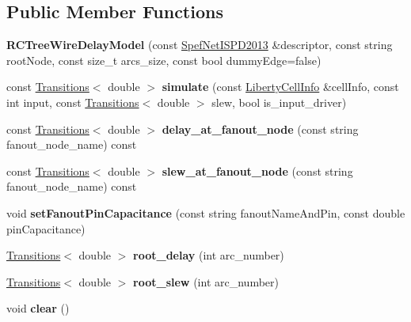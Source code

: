 \subsection*{Public Member Functions}
\begin{DoxyCompactItemize}
\item 
\hypertarget{classRCTreeWireDelayModel_a239d4784b2d39b6042fe39bee4838c6b}{{\bfseries R\-C\-Tree\-Wire\-Delay\-Model} (const \hyperlink{classSpefNetISPD2013}{Spef\-Net\-I\-S\-P\-D2013} \&descriptor, const string root\-Node, const size\-\_\-t arcs\-\_\-size, const bool dummy\-Edge=false)}\label{classRCTreeWireDelayModel_a239d4784b2d39b6042fe39bee4838c6b}

\item 
\hypertarget{classRCTreeWireDelayModel_a06312bef3b98f0903335227fd7ea0f31}{const \hyperlink{classTransitions}{Transitions}$<$ double $>$ {\bfseries simulate} (const \hyperlink{structLibertyCellInfo}{Liberty\-Cell\-Info} \&cell\-Info, const int input, const \hyperlink{classTransitions}{Transitions}$<$ double $>$ slew, bool is\-\_\-input\-\_\-driver)}\label{classRCTreeWireDelayModel_a06312bef3b98f0903335227fd7ea0f31}

\item 
\hypertarget{classRCTreeWireDelayModel_a7c769d54e8a520db1c5d4537d7e8b608}{const \hyperlink{classTransitions}{Transitions}$<$ double $>$ {\bfseries delay\-\_\-at\-\_\-fanout\-\_\-node} (const string fanout\-\_\-node\-\_\-name) const }\label{classRCTreeWireDelayModel_a7c769d54e8a520db1c5d4537d7e8b608}

\item 
\hypertarget{classRCTreeWireDelayModel_aea4c7315bdd3715ca0c67707b2c32a8c}{const \hyperlink{classTransitions}{Transitions}$<$ double $>$ {\bfseries slew\-\_\-at\-\_\-fanout\-\_\-node} (const string fanout\-\_\-node\-\_\-name) const }\label{classRCTreeWireDelayModel_aea4c7315bdd3715ca0c67707b2c32a8c}

\item 
\hypertarget{classRCTreeWireDelayModel_a106079b64e0e6b84327fc5a9b4c29a6a}{void {\bfseries set\-Fanout\-Pin\-Capacitance} (const string fanout\-Name\-And\-Pin, const double pin\-Capacitance)}\label{classRCTreeWireDelayModel_a106079b64e0e6b84327fc5a9b4c29a6a}

\item 
\hypertarget{classRCTreeWireDelayModel_a5575e4f4e598047dd87fee0707d135d3}{\hyperlink{classTransitions}{Transitions}$<$ double $>$ {\bfseries root\-\_\-delay} (int arc\-\_\-number)}\label{classRCTreeWireDelayModel_a5575e4f4e598047dd87fee0707d135d3}

\item 
\hypertarget{classRCTreeWireDelayModel_aa314aa73bf2e25008d330ad19544e210}{\hyperlink{classTransitions}{Transitions}$<$ double $>$ {\bfseries root\-\_\-slew} (int arc\-\_\-number)}\label{classRCTreeWireDelayModel_aa314aa73bf2e25008d330ad19544e210}

\item 
\hypertarget{classRCTreeWireDelayModel_acb14554ad26108d350770391b1923c51}{void {\bfseries clear} ()}\label{classRCTreeWireDelayModel_acb14554ad26108d350770391b1923c51}

\end{DoxyCompactItemize}
